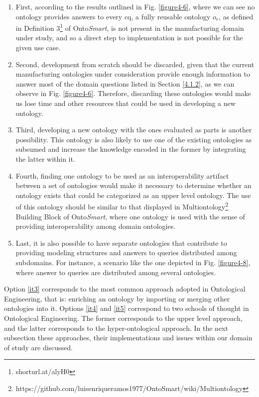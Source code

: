 \begin{enumerate}
	
	\item 	First, according to the results outlined in Fig. \ref{figure4-6}, where we can see no ontology provides answers to every \gls{cq}, a fully reusable ontology $o_{r}$, as defined in Definition 3\footnote{shorturl.at/alyH0} of Onto\textit{Smart}, is not present in the manufacturing domain under study, and so a direct step to implementation is not possible for the given use case.   \label{it1} 
	
	\item Second, development from scratch should be discarded, given that the current manufacturing ontologies under consideration provide enough information to answer most of the domain questions  listed in Section \ref{4.1.2}, as we can observe in Fig. \ref{figure4-6}. Therefore, discarding these ontologies would make us lose time and other resources that could be used in developing a new ontology. \label{it2}
	
	\item Third, developing a new ontology with the ones evaluated as parts is another possibility. This ontology is also likely to use one of the existing ontologies as subsumed   and increase the knowledge encoded in the former by integrating the latter within it. \label{it3}
	
	\item Fourth, finding one ontology to be used as an interoperability artifact between a set of ontologies would make it necessary to determine whether an ontology exists that could be categorized as an upper level ontology. The use of this ontology should be similar to that displayed in Multiontology\footnote{https://github.com/luisenriqueramos1977/OntoSmart/wiki/Multiontology} Building Block of Onto\textit{Smart}, where one ontology is used with the sense of providing interoperability among domain ontologies. \label{it4}
	
	\item  Last, it is also possible to have separate ontologies that contribute to providing modeling structures and answers to queries distributed among subdomains.   For instance, a scenario like the one depicted in Fig. \ref{figure4-8}, where answer to queries are distributed among several ontologies.  \label{it5}
	
\end{enumerate}

Option \ref{it3} corresponds to the most common approach adopted in Ontological Engineering, that is: enriching an ontology by importing or merging other ontologies into it. Options \ref{it4} and \ref{it5} correspond to two schools of thought in Ontological Engineering. The former corresponds to the upper level approach, and the latter corresponds to the hyper-ontological approach. In the next subsection these approaches, their implementations and issues within our domain of study are discussed.


